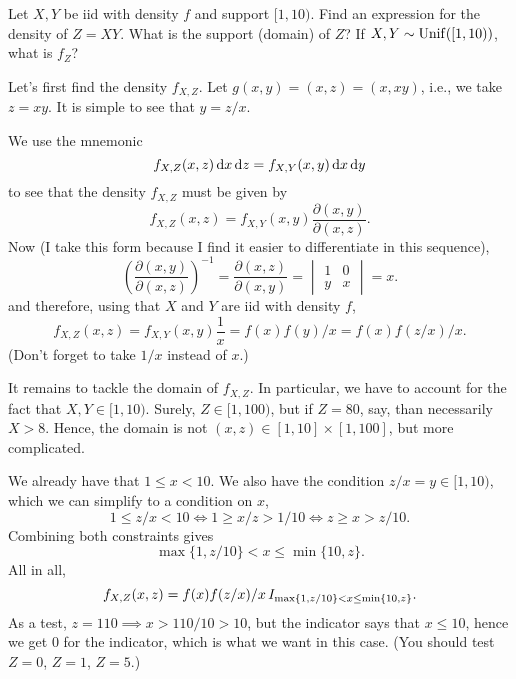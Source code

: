\documentclass[lectures]{subfiles}
\begin{document}
\begin{exercise}
Let $X,Y$ be iid with density $f$ and support $[1,10)$. Find an expression for the density of $Z=X Y$. What is the support (domain) of $Z$? If $X,Y\sim\mathrm{Unif}([1,10))$, what is $f_{Z}$?
\begin{solution}
Let's first find the density $f_{X,Z}$.
Let $g(x,y) = (x, z) = (x, x y)$, i.e., we take $z=x y$. It is simple to see that $y=z/x$.

We use the mnemonic
\begin{equation}
\label{eq:0520}
f_{X,Z}(x,z) \,\textrm{d}x \,\textrm{d}z =
f_{X,Y}(x,y) \,\textrm{d}x \,\textrm{d}y
\end{equation}
to see that the density $f_{X,Z}$ must be given by
\begin{equation}
f_{X,Z}(x,z)  = f_{X,Y}(x,y) \frac{\partial(x,y)}{\partial(x, z)}.
\end{equation}
Now (I take this form because I find it easier to differentiate in this sequence),
\begin{equation}
\label{eq:0519}
\left(\frac{\partial(x,y)}{\partial(x,z)}\right)^{-1} =
\frac{\partial(x,z)}{\partial(x,y)} =
\begin{vmatrix}
  1 & 0 \\
y & x
\end{vmatrix} = x.
\end{equation}
and therefore, using that $X$ and $Y$ are iid with density $f$,
\begin{equation}
f_{X,Z}(x,z)  = f_{X,Y}(x,y) \frac{1}{x} = f(x)f(y)/x = f(x)f(z/x)/ x.
\end{equation}
(Don't forget to take $1/x$ instead of $x$.)

It remains to tackle the domain of $f_{X,Z}$.
In particular, we have to account for the fact that $X, Y\in [1,10)$.
Surely, $Z\in [1, 100)$, but if $Z=80$, say, than necessarily $X>8$.
Hence, the domain is not $(x,z) \in [1,10]\times [1, 100]$, but more complicated.

We already have that $1\leq x < 10$. We also have the condition $z/x = y\in [1, 10)$, which we can simplify to a condition on $x$,
\begin{equation}
\label{eq:0522}
1\leq z/x < 10 \iff 1 \geq x/z > 1/10 \iff z \geq x > z/10.
\end{equation}
Combining both constraints gives
\begin{equation}
\max\{1, z/10\} < x \leq \min\{10, z\}.
\end{equation}
All in all,
\begin{equation}
f_{X,Z}(x,z)  = f(x)f(z/x)/ x \,I_{\max\{1, z/10\}< x \leq \min\{10, z\}}.
\end{equation}
As a test, $z=110 \implies x > 110/10 > 10$, but the indicator says that $x\leq 10$, hence we get 0 for the indicator, which is what we want in this case. (You should test $Z=0$, $Z=1$, $Z=5$.)


\end{solution}
\end{exercise}
\end{document}
